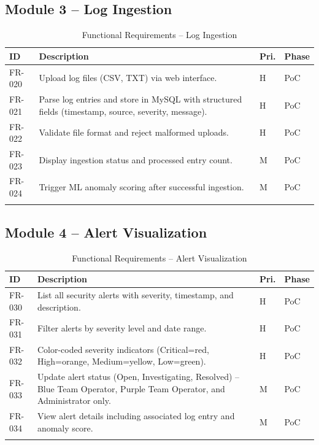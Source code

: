 \documentclass[12pt,a4paper]{report}
\begin{document}
	\subsection{Module 3 -- Log Ingestion}
	\begin{longtable}{L{1.6cm} L{7.8cm} C{1.2cm} C{1.4cm}}
		\toprule
		\textbf{ID} & \textbf{Description} & \textbf{Pri.} & \textbf{Phase} \\
		\midrule
		FR-020 & Upload log files (CSV, TXT) via web interface. & H & PoC \\
		FR-021 & Parse log entries and store in MySQL with structured fields (timestamp, source, severity, message). & H & PoC \\
		FR-022 & Validate file format and reject malformed uploads. & H & PoC \\
		FR-023 & Display ingestion status and processed entry count. & M & PoC \\
		FR-024 & Trigger ML anomaly scoring after successful ingestion. & M & PoC \\
		\bottomrule
		\caption{Functional Requirements -- Log Ingestion}
	\end{longtable}
	
	\subsection{Module 4 -- Alert Visualization}
	\begin{longtable}{L{1.6cm} L{7.8cm} C{1.2cm} C{1.4cm}}
		\toprule
		\textbf{ID} & \textbf{Description} & \textbf{Pri.} & \textbf{Phase} \\
		\midrule
		FR-030 & List all security alerts with severity, timestamp, and description. & H & PoC \\
		FR-031 & Filter alerts by severity level and date range. & H & PoC \\
		FR-032 & Color-coded severity indicators (Critical=red, High=orange, Medium=yellow, Low=green). & H & PoC \\
		FR-033 & Update alert status (Open, Investigating, Resolved) -- Blue Team Operator, Purple Team Operator, and Administrator only. & M & PoC \\
		FR-034 & View alert details including associated log entry and anomaly score. & M & PoC \\
		\bottomrule
		\caption{Functional Requirements -- Alert Visualization}
	\end{longtable}
	
\end{document}
